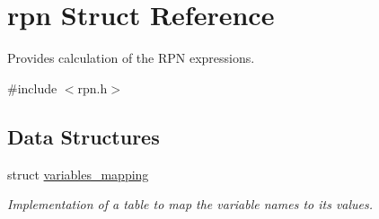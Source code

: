 \hypertarget{structrpn}{\section{rpn Struct Reference}
\label{structrpn}
}


Provides calculation of the R\-P\-N expressions.  




{\ttfamily \#include $<$rpn.\-h$>$}

\subsection*{Data Structures}
\begin{DoxyCompactItemize}
\item 
struct \hyperlink{structrpn_1_1variables__mapping}{variables\-\_\-mapping}
\begin{DoxyCompactList}\small\item\em Implementation of a table to map the variable names to its values. \end{DoxyCompactList}\end{DoxyCompactItemize}
